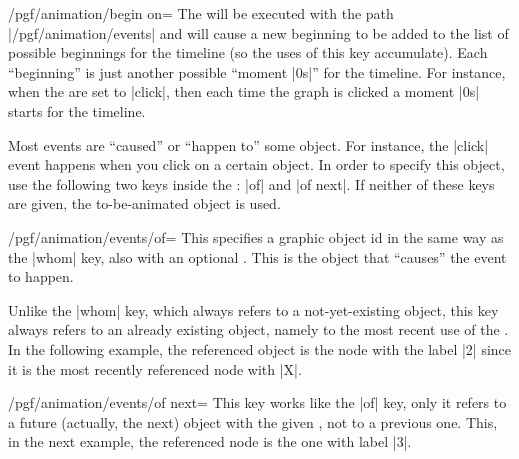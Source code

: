 \begin{key}{/pgf/animation/begin on=}
  The  will be executed with the path
  |/pgf/animation/events| and will cause a new beginning to be added
  to the list of possible beginnings for the timeline (so the uses of
  this key accumulate). Each ``beginning'' is just another possible
  ``moment |0s|'' for the timeline. For instance, when the
   are set to |click|, then each time the graph is
  clicked a moment |0s| starts for the timeline.

  Most events are ``caused'' or ``happen to'' some object. For
  instance, the |click| event happens when you click on a certain
  object. In order to specify this object, use the following two keys
  inside the : |of| and |of next|. If neither of these
  keys are given, the to-be-animated object is used.
  
  \begin{key}{/pgf/animation/events/of=}
    This specifies a graphic object id in the same way as the |whom|
    key, also with an optional . This is the object that
    ``causes'' the event to happen.

    Unlike the |whom| key, which always refers to a not-yet-existing
    object, this key always refers to an already existing
    object, namely to the most recent use of the . In the
    following example, the referenced object is the node with the
    label |2| since it is the most recently referenced node with
     |X|.
\begin{codeexample}[width=3cm]
\end{codeexample}
  \end{key}
  
  \begin{key}{/pgf/animation/events/of next=}
    This key works like the |of| key, only it refers to a future
    (actually, the next) object with the given , not to a
    previous one. This, in the next example, the referenced node is
    the one with label |3|.
\begin{codeexample}[width=3cm]
\end{codeexample}
  \end{key}


\end{key}
